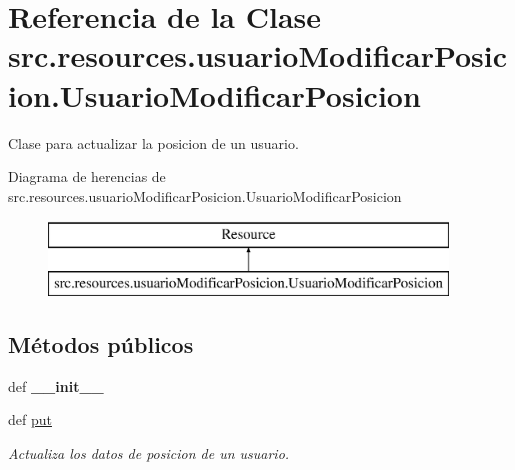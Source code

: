 \hypertarget{classsrc_1_1resources_1_1usuario_modificar_posicion_1_1_usuario_modificar_posicion}{\section{Referencia de la Clase src.\-resources.\-usuario\-Modificar\-Posicion.\-Usuario\-Modificar\-Posicion}
\label{classsrc_1_1resources_1_1usuario_modificar_posicion_1_1_usuario_modificar_posicion}
}


Clase para actualizar la posicion de un usuario.  


Diagrama de herencias de src.\-resources.\-usuario\-Modificar\-Posicion.\-Usuario\-Modificar\-Posicion\begin{figure}[H]
\begin{center}
\leavevmode
\includegraphics[height=2.000000cm]{classsrc_1_1resources_1_1usuario_modificar_posicion_1_1_usuario_modificar_posicion}
\end{center}
\end{figure}
\subsection*{Métodos públicos}
\begin{DoxyCompactItemize}
\item 
\hypertarget{classsrc_1_1resources_1_1usuario_modificar_posicion_1_1_usuario_modificar_posicion_a3510528dc54022281dbc9a5756507bec}{def {\bfseries \-\_\-\-\_\-init\-\_\-\-\_\-}}\label{classsrc_1_1resources_1_1usuario_modificar_posicion_1_1_usuario_modificar_posicion_a3510528dc54022281dbc9a5756507bec}

\item 
def \hyperlink{classsrc_1_1resources_1_1usuario_modificar_posicion_1_1_usuario_modificar_posicion_aa836c3ed2ae1d5124b5f093b99c789d0}{put}
\begin{DoxyCompactList}\small\item\em Actualiza los datos de posicion de un usuario. \end{DoxyCompactList}\end{DoxyCompactItemize}
